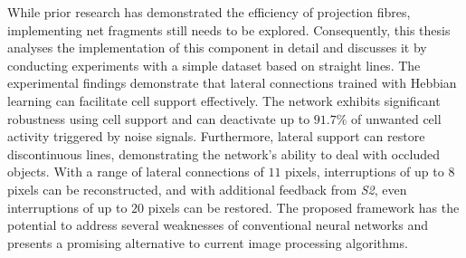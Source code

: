 While prior research has demonstrated the efficiency of projection fibres, implementing net fragments still needs to be explored.
Consequently, this thesis analyses the implementation of this component in detail and discusses it by conducting experiments with a simple dataset based on straight lines.
The experimental findings demonstrate that lateral connections trained with Hebbian learning can facilitate cell support effectively.
The network exhibits significant robustness using cell support and can deactivate up to $91.7\%$ of unwanted cell activity triggered by noise signals. Furthermore, lateral support can restore discontinuous lines, demonstrating the network's ability to deal with occluded objects. With a range of lateral connections of $11$ pixels, interruptions of up to $8$ pixels can be reconstructed, and with additional feedback from \emph{S2}, even interruptions of up to $20$ pixels can be restored. The proposed framework has the potential to address several weaknesses of conventional neural networks and presents a promising alternative to current image processing algorithms.
